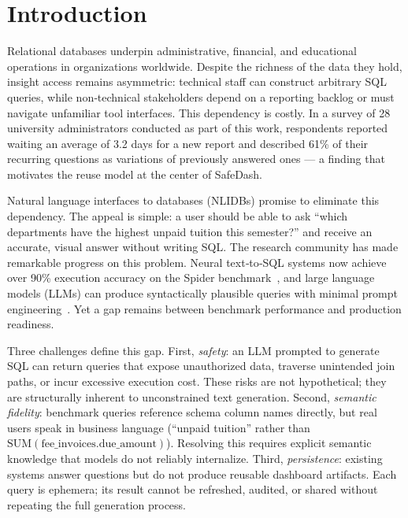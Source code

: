 \documentclass[11pt]{article}
\begin{document}
\section{Introduction}
Relational databases underpin administrative, financial, and educational operations in organizations worldwide. Despite the richness of the data they hold, insight access remains asymmetric: technical staff can construct arbitrary SQL queries, while non‑technical stakeholders depend on a reporting backlog or must navigate unfamiliar tool interfaces. This dependency is costly. In a survey of 28 university administrators conducted as part of this work, respondents reported waiting an average of 3.2 days for a new report and described 61\% of their recurring questions as variations of previously answered ones — a finding that motivates the reuse model at the center of SafeDash.

Natural language interfaces to databases (NLIDBs) promise to eliminate this dependency. The appeal is simple: a user should be able to ask ``which departments have the highest unpaid tuition this semester?'' and receive an accurate, visual answer without writing SQL. The research community has made remarkable progress on this problem. Neural text‑to‑SQL systems now achieve over 90\% execution accuracy on the Spider benchmark~\cite{yu2018spider}, and large language models (LLMs) can produce syntactically plausible queries with minimal prompt engineering~\cite{li2023bigbench}. Yet a gap remains between benchmark performance and production readiness.

Three challenges define this gap. First, \emph{safety}: an LLM prompted to generate SQL can return queries that expose unauthorized data, traverse unintended join paths, or incur excessive execution cost. These risks are not hypothetical; they are structurally inherent to unconstrained text generation. Second, \emph{semantic fidelity}: benchmark queries reference schema column names directly, but real users speak in business language (``unpaid tuition'' rather than $\mathrm{SUM}(\mathrm{fee\_invoices.due\_amount})$). Resolving this requires explicit semantic knowledge that models do not reliably internalize. Third, \emph{persistence}: existing systems answer questions but do not produce reusable dashboard artifacts. Each query is ephemera; its result cannot be refreshed, audited, or shared without repeating the full generation process.
\end{document}
